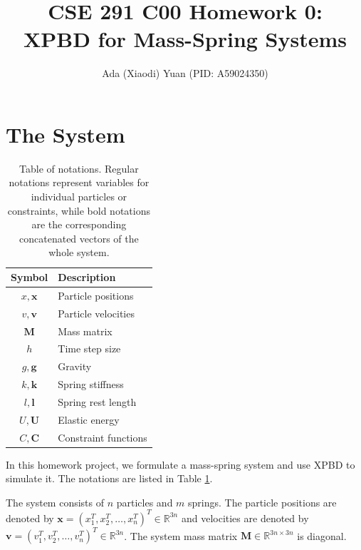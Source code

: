 \documentclass[conference]{IEEEtran}
\title{CSE 291 C00 Homework 0: \\ XPBD for Mass-Spring Systems}
\author{\Large Ada (Xiaodi) Yuan (PID: A59024350) \vspace{1em}}
\begin{document}
\maketitle
\pagestyle{plain}


\section{The System}
\vspace{0.7em}

\begin{table}[htbp]
\centering
\begin{tabular}{cl}
\toprule
\textbf{Symbol} & \textbf{Description} \\
\midrule
$x, \mathbf x$ & Particle positions \\
$v, \mathbf v$ & Particle velocities \\
$\mathbf M$ & Mass matrix \\
$h$ & Time step size \\
$g, \mathbf g$ & Gravity \\
$k, \mathbf k$ & Spring stiffness \\
$l, \mathbf l$ & Spring rest length \\
$U, \mathbf U$ & Elastic energy \\
$C, \mathbf C$ & Constraint functions \\

\bottomrule
\end{tabular}
\vspace{0.7em}
\caption{Table of notations. Regular notations represent variables for individual particles or constraints, while bold notations are the corresponding concatenated vectors of the whole system.}
\label{tab:notations}
\end{table}

In this homework project, we formulate a mass-spring system and use XPBD \cite{macklin_xpbd_2016} to simulate it. The notations are listed in Table \ref{tab:notations}. 

The system consists of $n$ particles and $m$ springs. The particle positions are denoted by $\mathbf x = (x_1^T, x_2^T, \ldots, x_n^T)^T \in \mathbb R^{3n}$ and velocities are denoted by $\mathbf v = (v_1^T, v_2^T, \ldots, v_n^T)^T \in \mathbb R^{3n}$. The system mass matrix $\mathbf M \in \mathbb R^{3n\times 3n}$ is diagonal. 
\end{document}
